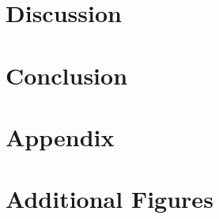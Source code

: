 \documentclass[a4paper,doc,natbib,floatsintext]{apa6}\usepackage[]{graphicx}\usepackage[]{color}
\begin{document}
\section{Discussion}




\section{Conclusion}


\break

\section{Appendix}


\section{Additional Figures}




\end{document}
